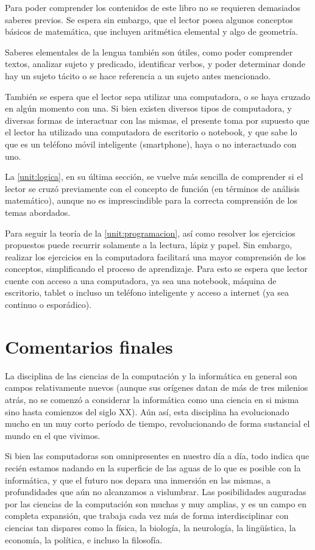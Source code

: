Para poder comprender los contenidos de este libro no se requieren demasiados
saberes previos. Se espera sin embargo, que el lector posea algunos conceptos
básicos de matemática, que incluyen aritmética elemental y algo de geometría.

Saberes elementales de la lengua también son útiles, como poder comprender
textos, analizar sujeto y predicado, identificar verbos, y poder determinar
donde hay un sujeto tácito o se hace referencia a un sujeto antes mencionado.

También se espera que el lector sepa utilizar una computadora, o se haya cruzado
en algún momento con una. Si bien existen diversos tipos de computadora, y
diversas formas de interactuar con las mismas, el presente toma por supuesto que
el lector ha utilizado una computadora de escritorio o notebook, y que sabe lo
que es un teléfono móvil inteligente (smartphone), haya o no interactuado con
uno.

La \autoref{unit:logica}, en su última sección, se vuelve más sencilla de
comprender si el lector se cruzó previamente con el concepto de función (en
términos de análisis matemático), aunque no es imprescindible para la correcta
comprensión de los temas abordados.

Para seguir la teoría de la \autoref{unit:programacion}, así como resolver los
ejercicios propuestos puede recurrir solamente a la lectura, lápiz y papel. Sin
embargo, realizar los ejercicios en la computadora facilitará una mayor
comprensión de los conceptos, simplificando el proceso de aprendizaje. Para esto
se espera que lector cuente con acceso a una computadora, ya sea una notebook,
máquina de escritorio, tablet o incluso un teléfono inteligente y acceso a
internet (ya sea continuo o esporádico).

\section*{Comentarios finales}

La disciplina de las ciencias de la computación y la informática en general son
campos relativamente nuevos (aunque sus orígenes datan de más de tres milenios
atrás, no se comenzó a considerar la informática como una ciencia en si misma
sino hasta comienzos del siglo XX). Aún así, esta disciplina ha evolucionado
mucho en un muy corto período de tiempo, revolucionando de forma sustancial el
mundo en el que vivimos.

Si bien las computadoras son omnipresentes en nuestro día a día, todo indica que
recién estamos nadando en la superficie de las aguas de lo que es posible con la
informática, y que el futuro nos depara una inmersión en las mismas, a
profundidades que aún no alcanzamos a vislumbrar. Las posibilidades auguradas
por las ciencias de la computación son muchas y muy amplias, y es un campo en
completa expansión, que trabaja cada vez más de forma interdisciplinar con
ciencias tan dispares como la física, la biología, la neurología, la
lingüística, la economía, la política, e incluso la filosofía.

